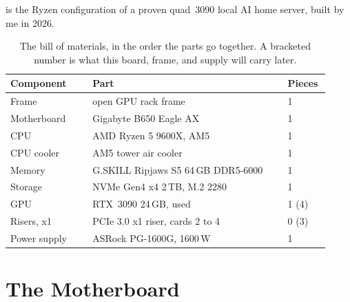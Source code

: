  is the Ryzen configuration of a proven quad~3090 local
AI home server, built by me in 2026.

\vspace{2\baselineskip}
\begin{table}[!ht]
\centering
\begin{tabular}{p{0.24\linewidth}p{0.58\linewidth}p{0.10\linewidth}}
    \toprule
    \textbf{Component} & \textbf{Part} & \textbf{Pieces} \\
    \midrule
    Frame & open GPU rack frame & 1 \\
    Motherboard & Gigabyte B650 Eagle AX & 1 \\
    CPU & AMD Ryzen 5 9600X, AM5 & 1 \\
    CPU cooler & AM5 tower air cooler & 1 \\
    Memory & G.SKILL Ripjaws S5 64\,GB DDR5-6000 & 1 \\
    Storage & NVMe Gen4 x4 2\,TB, M.2 2280 & 1 \\
    GPU & RTX~3090 24\,GB, used & 1 (4) \\
    Risers, x1 & PCIe 3.0 x1 riser, cards 2 to 4 & 0 (3) \\
    Power supply & ASRock PG-1600G, 1600\,W & 1 \\
    \bottomrule
\end{tabular}
\vspace{1.5em}
\caption{The bill of materials, in the order the parts go together. A bracketed
number is what this board, frame, and supply will carry later.} \label{tab:bom}
\end{table}


\newpage
\section{The Motherboard}

